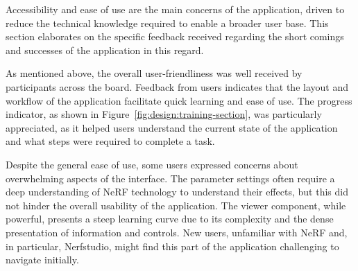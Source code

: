 Accessibility and ease of use are the main concerns of the application, driven to reduce the technical knowledge required to enable a broader user base.
This section elaborates on the specific feedback received regarding the short comings and successes of the application in this regard.

As mentioned above, the overall user-friendliness was well received by participants across the board.
Feedback from users indicates that the layout and workflow of the application facilitate quick learning and ease of use.
\cite{P4, P5, P7, P8, P10}
The progress indicator, as shown in Figure~\ref{fig:design:training-section}, was particularly appreciated, as it helped users understand the current state of the application and what steps were required to complete a task.
\cite{P5, P7, P8, P9}


Despite the general ease of use, some users expressed concerns about overwhelming aspects of the interface.
The parameter settings often require a deep understanding of NeRF technology to understand their effects, but this did not hinder the overall usability of the application.
\cite{P5, P7}
The viewer component, while powerful, presents a steep learning curve due to its complexity and the dense presentation of information and controls. 
New users, unfamiliar with NeRF and, in particular, Nerfstudio, might find this part of the application challenging to navigate initially.
\cite{P2}


